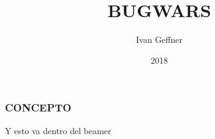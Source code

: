 \documentclass{beamer}
\title{BUGWARS}
\author{Ivan Geffner}
\institute{FME-UPC}
\date{2018}
\begin{document}
\begin{frame}
	\titlepage
	\tableofcontents
\end{frame}

\begin{frame}
	\frametitle{CONCEPTO}
	Y esto va dentro del beamer
\end{frame}
\end{document}
